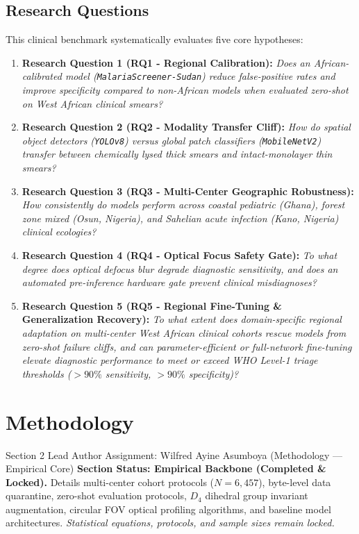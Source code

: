 \documentclass[a4paper,11pt]{article}
\begin{document}
\subsection{Research Questions}
This clinical benchmark systematically evaluates five core hypotheses:
\begin{enumerate}\itemsep2pt
    \item \textbf{Research Question 1 (RQ1 - Regional Calibration):} \textit{Does an African-calibrated model (\texttt{MalariaScreener-Sudan}) reduce false-positive rates and improve specificity compared to non-African models when evaluated zero-shot on West African clinical smears?}
    \item \textbf{Research Question 2 (RQ2 - Modality Transfer Cliff):} \textit{How do spatial object detectors (\texttt{YOLOv8}) versus global patch classifiers (\texttt{MobileNetV2}) transfer between chemically lysed thick smears and intact-monolayer thin smears?}
    \item \textbf{Research Question 3 (RQ3 - Multi-Center Geographic Robustness):} \textit{How consistently do models perform across coastal pediatric (Ghana), forest zone mixed (Osun, Nigeria), and Sahelian acute infection (Kano, Nigeria) clinical ecologies?}
    \item \textbf{Research Question 4 (RQ4 - Optical Focus Safety Gate):} \textit{To what degree does optical defocus blur degrade diagnostic sensitivity, and does an automated pre-inference hardware gate prevent clinical misdiagnoses?}
    \item \textbf{Research Question 5 (RQ5 - Regional Fine-Tuning \& Generalization Recovery):} \textit{To what extent does domain-specific regional adaptation on multi-center West African clinical cohorts rescue models from zero-shot failure cliffs, and can parameter-efficient or full-network fine-tuning elevate diagnostic performance to meet or exceed WHO Level-1 triage thresholds ($>90\%$ sensitivity, $>90\%$ specificity)?}
\end{enumerate}

\section{Methodology}
\label{sec:methods}

\begin{infobox}{Section 2 Lead Author Assignment: Wilfred Ayine Asumboya (Methodology --- Empirical Core)}
\textbf{Section Status: Empirical Backbone (Completed \& Locked).} Details multi-center cohort protocols ($N = 6,457$), byte-level data quarantine, zero-shot evaluation protocols, $D_4$ dihedral group invariant augmentation, circular FOV optical profiling algorithms, and baseline model architectures. \textit{Statistical equations, protocols, and sample sizes remain locked.}
\end{infobox}
\end{document}
